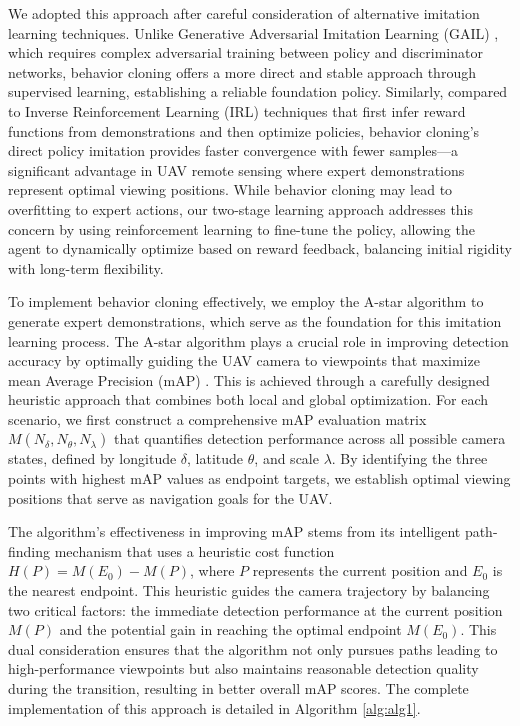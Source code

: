 \documentclass[lettersize,journal]{IEEEtran}
\begin{document}
We adopted this approach after careful consideration of alternative imitation learning techniques. Unlike Generative Adversarial Imitation Learning (GAIL) \cite{generative2016}, which requires complex adversarial training between policy and discriminator networks, behavior cloning offers a more direct and stable approach through supervised learning, establishing a reliable foundation policy. Similarly, compared to Inverse Reinforcement Learning (IRL) \cite{algorithms2000} techniques that first infer reward functions from demonstrations and then optimize policies, behavior cloning's direct policy imitation provides faster convergence with fewer samples—a significant advantage in UAV remote sensing where expert demonstrations represent optimal viewing positions. While behavior cloning may lead to overfitting to expert actions, our two-stage learning approach addresses this concern by using reinforcement learning to fine-tune the policy, allowing the agent to dynamically optimize based on reward feedback, balancing initial rigidity with long-term flexibility.

To implement behavior cloning effectively, we employ the A-star algorithm to generate expert demonstrations, which serve as the foundation for this imitation learning process. The A-star algorithm plays a crucial role in improving detection accuracy by optimally guiding the UAV camera to viewpoints that maximize mean Average Precision (mAP) \cite{microsoft2014}.  This is achieved through a carefully designed heuristic approach that combines both local and global optimization.  For each scenario, we first construct a comprehensive mAP evaluation matrix $M(N_\delta,N_\theta,N_\lambda)$ that quantifies detection performance across all possible camera states, defined by longitude $\delta$, latitude $\theta$, and scale $\lambda$.  By identifying the three points with highest mAP values as endpoint targets, we establish optimal viewing positions that serve as navigation goals for the UAV.

The algorithm's effectiveness in improving mAP stems from its intelligent path-finding mechanism that uses a heuristic cost function $H(P)=M(E_0)-M(P)$, where $P$ represents the current position and $E_0$ is the nearest endpoint.  This heuristic guides the camera trajectory by balancing two critical factors: the immediate detection performance at the current position $M(P)$ and the potential gain in reaching the optimal endpoint $M(E_0)$.  This dual consideration ensures that the algorithm not only pursues paths leading to high-performance viewpoints but also maintains reasonable detection quality during the transition, resulting in better overall mAP scores. The complete implementation of this approach is detailed in Algorithm \ref{alg:alg1}.
\end{document}
